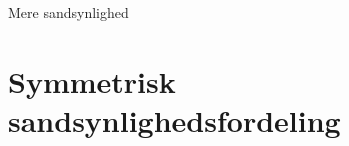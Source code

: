 





\begin{center}
\Huge
Mere sandsynlighed
\end{center}
\section*{Symmetrisk sandsynlighedsfordeling}

